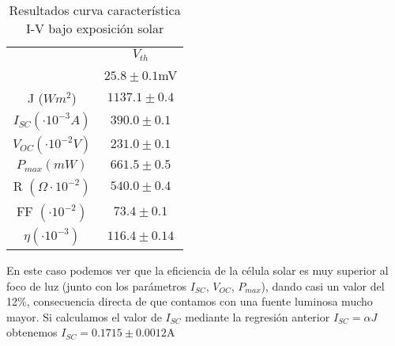 \begin{table}[t]
	\centering
	\begin{tabular}{cc}
		\toprule
		\multicolumn{1}{c}{} & \multicolumn{1}{c}{$V_{th}$} \\
		\cmidrule(r){2-2}
		& $25.8 \pm 0.1$mV     \\
		\midrule
		J ($Wm^2$) & $1137.1 \pm 0.4$    \\
		$I_{SC} (\cdot 10^{-3}A)$ & $390.0 \pm 0.1$    \\
		$V_{OC} (\cdot 10^{-2}V)$ & $231.0 \pm 0.1$    \\
		$P_{max} (mW)$ & $661.5 \pm 0.5$    \\
		R $(\Omega \cdot 10^{-2})$ & $540.0 \pm 0.4$    \\
		FF $(\cdot 10^{-2})$ & $73.4 \pm 0.1$    \\
		$\eta (\cdot 10^{-3})$ & $116.4 \pm 0.14$    \\
		\bottomrule
	\end{tabular}
	\caption{Resultados curva característica I-V bajo exposición solar}
	\label{table_exp5}
\end{table}

En este caso podemos ver que la eficiencia de la célula solar es muy superior al foco de luz (junto con los parámetros $I_{SC}$, $V_{OC}$, $P_{max}$), dando casi un valor del 12\%, consecuencia directa de que contamos con una fuente luminosa mucho mayor. Si calculamos el valor de $I_{SC}$ mediante la regresión anterior $I_{SC} = \alpha J$ obtenemos $I_{SC} = 0.1715 \pm 0.0012$A